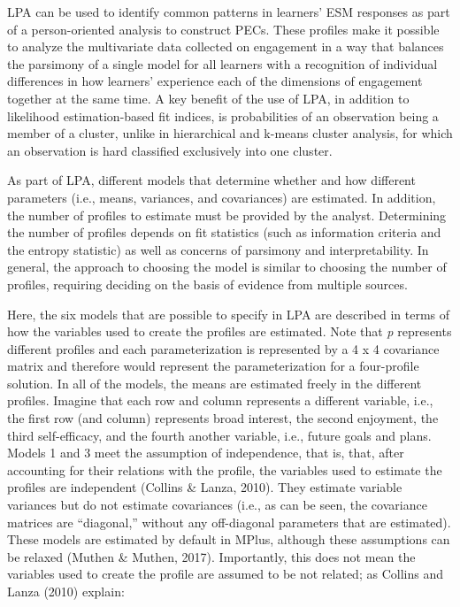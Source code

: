 \documentclass[]{msu-thesis}
\theoremstyle{definition}
\theoremstyle{definition}
\theoremstyle{definition}
\theoremstyle{remark}
\begin{document}
LPA can be used to identify common patterns in learners' ESM responses
as part of a person-oriented analysis to construct PECs. These profiles
make it possible to analyze the multivariate data collected on
engagement in a way that balances the parsimony of a single model for
all learners with a recognition of individual differences in how
learners' experience each of the dimensions of engagement together at
the same time. A key benefit of the use of LPA, in addition to
likelihood estimation-based fit indices, is probabilities of an
observation being a member of a cluster, unlike in hierarchical and
k-means cluster analysis, for which an observation is hard classified
exclusively into one cluster.

As part of LPA, different models that determine whether and how
different parameters (i.e., means, variances, and covariances) are
estimated. In addition, the number of profiles to estimate must be
provided by the analyst. Determining the number of profiles depends on
fit statistics (such as information criteria and the entropy statistic)
as well as concerns of parsimony and interpretability. In general, the
approach to choosing the model is similar to choosing the number of
profiles, requiring deciding on the basis of evidence from multiple
sources.

Here, the six models that are possible to specify in LPA are described
in terms of how the variables used to create the profiles are estimated.
Note that \emph{p} represents different profiles and each
parameterization is represented by a 4 x 4 covariance matrix and
therefore would represent the parameterization for a four-profile
solution. In all of the models, the means are estimated freely in the
different profiles. Imagine that each row and column represents a
different variable, i.e., the first row (and column) represents broad
interest, the second enjoyment, the third self-efficacy, and the fourth
another variable, i.e., future goals and plans. Models 1 and 3 meet the
assumption of independence, that is, that, after accounting for their
relations with the profile, the variables used to estimate the profiles
are independent (Collins \& Lanza, 2010). They estimate variable
variances but do not estimate covariances (i.e., as can be seen, the
covariance matrices are ``diagonal,'' without any off-diagonal
parameters that are estimated). These models are estimated by default in
MPlus, although these assumptions can be relaxed (Muthen \& Muthen,
2017). Importantly, this does not mean the variables used to create the
profile are assumed to be not related; as Collins and Lanza (2010)
explain:
\end{document}
